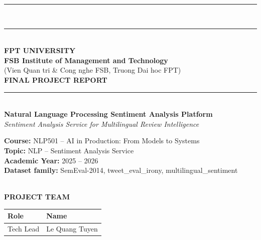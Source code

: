 \documentclass[12pt, a4paper]{article}
\begin{document}
\begin{titlepage}
\thispagestyle{empty}
\centering

{\color{NavyBlue}\rule{\linewidth}{3pt}}\\[0.3em]
{\color{SteelBlue}\rule{\linewidth}{1pt}}\\[1.2cm]

{\Large\bfseries\color{NavyBlue} FPT UNIVERSITY}\\[0.3em]
{\large\bfseries\color{MidnightBlue} FSB Institute of Management and Technology}\\[0.2em]
{\small\color{gray} (Vien Quan tri \& Cong nghe FSB, Truong Dai hoc FPT)}\\[1.2cm]

{\Large\bfseries\color{NavyBlue} FINAL PROJECT REPORT}\\[0.6em]
{\color{SteelBlue}\rule{0.62\linewidth}{0.8pt}}\\[0.9cm]

{\Huge\bfseries\color{NavyBlue} Natural Language Processing Sentiment Analysis Platform}\\[0.4em]
{\large\itshape\color{MidnightBlue} Sentiment Analysis Service for Multilingual Review Intelligence}\\[1.0cm]

\colorbox{NavyBlue!12}{%
  \begin{minipage}{0.8\textwidth}\centering\vspace{0.35em}
    {\small\bfseries Course:} {\small NLP501 -- AI in Production: From Models to Systems}\\[0.2em]
    {\small\bfseries Topic:} {\small NLP -- Sentiment Analysis Service}\\[0.2em]
    {\small\bfseries Academic Year:} {\small 2025 -- 2026}\\[0.2em]
    {\small\bfseries Dataset family:} {\small SemEval-2014, tweet\_eval\_irony, multilingual\_sentiment}\vspace{0.35em}
  \end{minipage}
}\\[1.1cm]
{\large\bfseries\color{NavyBlue} PROJECT TEAM}\\[0.8em]

\renewcommand{\arraystretch}{1.3}

\begin{tabularx}{0.9\textwidth}{@{}p{4cm}X@{}}
\toprule
\textbf{Role} & \textbf{Name} \\
\midrule
Tech Lead & Le Quang Tuyen \\


\end{tabularx}
\end{titlepage}
\end{document}
